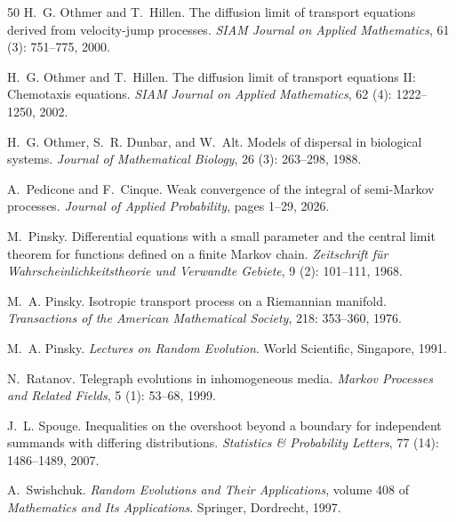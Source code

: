\documentclass[10pt]{article}
\newcommand{\1}{1\!\!\!\;{\rm I}}
\theoremstyle{plain}
\theoremstyle{definition}
\numberwithin{equation}{section}
\begin{document}
\begin{thebibliography}{50}
H.~G. Othmer and T.~Hillen.
\newblock The diffusion limit of transport equations derived from velocity-jump
  processes.
\newblock \emph{SIAM Journal on Applied Mathematics}, 61 (3):
  751--775, 2000.

H.~G. Othmer and T.~Hillen.
\newblock The diffusion limit of transport equations {II}: {C}hemotaxis
  equations.
\newblock \emph{SIAM Journal on Applied Mathematics}, 62 (4):
  1222--1250, 2002.

H.~G. Othmer, S.~R. Dunbar, and W.~Alt.
\newblock Models of dispersal in biological systems.
\newblock \emph{Journal of Mathematical Biology}, 26 (3):
  263--298, 1988.

A.~Pedicone and F.~Cinque.
\newblock Weak convergence of the integral of semi-{M}arkov processes.
\newblock \emph{Journal of Applied Probability}, pages 1--29, 2026.

M.~Pinsky.
\newblock Differential equations with a small parameter and the central limit
  theorem for functions defined on a finite {M}arkov chain.
\newblock \emph{Zeitschrift f{\"u}r Wahrscheinlichkeitstheorie und Verwandte
  Gebiete}, 9 (2): 101--111, 1968.

M.~A. Pinsky.
\newblock Isotropic transport process on a {R}iemannian manifold.
\newblock \emph{Transactions of the American Mathematical Society},
  218: 353--360, 1976.

M.~A. Pinsky.
\newblock \emph{Lectures on Random Evolution}.
\newblock World Scientific, Singapore, 1991.

N.~Ratanov.
\newblock Telegraph evolutions in inhomogeneous media.
\newblock \emph{Markov Processes and Related Fields}, 5 (1):
  53--68, 1999.

J.~L. Spouge.
\newblock Inequalities on the overshoot beyond a boundary for independent
  summands with differing distributions.
\newblock \emph{Statistics \& Probability Letters}, 77 (14):
  1486--1489, 2007.

A.~Swishchuk.
\newblock \emph{Random Evolutions and Their Applications}, volume 408 of
  \emph{Mathematics and Its Applications}.
\newblock Springer, Dordrecht, 1997.


\end{thebibliography}
\end{document}
